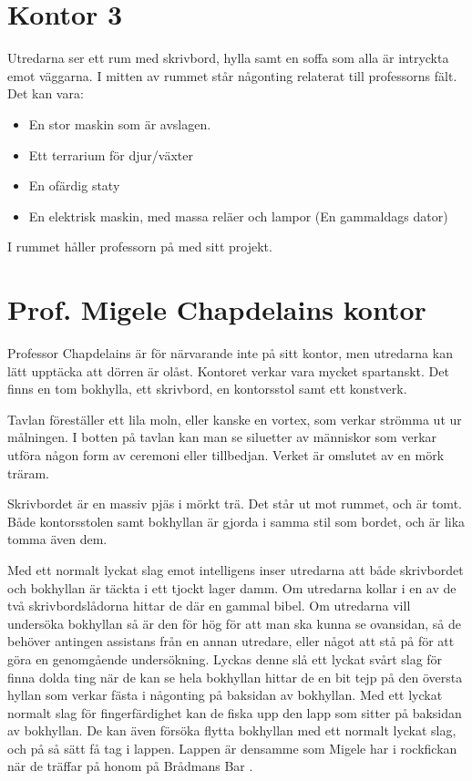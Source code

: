 \section*{Kontor 3}
Utredarna ser ett rum med skrivbord, hylla samt en soffa som alla är intryckta emot väggarna. I mitten av rummet står någonting relaterat till professorns fält. Det kan vara:
%
\begin{itemize}
	\item En stor maskin som är avslagen.
	\item Ett terrarium för djur/växter
	\item En ofärdig staty
	\item En elektrisk maskin, med massa reläer och lampor (En gammaldags dator)
\end{itemize}

I rummet håller professorn på med sitt projekt.


\section{Prof. Migele Chapdelains kontor}
\label{loc:ChapdelainsKontor}
%
Professor Chapdelains är för närvarande inte på sitt kontor, men utredarna kan lätt upptäcka att dörren är olåst. Kontoret verkar vara mycket spartanskt. Det finns en tom bokhylla, ett skrivbord, en kontorsstol samt ett konstverk.

\begin{displayquote}
	Tavlan föreställer ett lila moln, eller kanske en vortex, som verkar strömma ut ur målningen. I botten på tavlan kan man se siluetter av människor som verkar utföra någon form av ceremoni eller tillbedjan. Verket är omslutet av en mörk träram.
\end{displayquote}

\begin{displayquote}
	Skrivbordet är en massiv pjäs i mörkt trä. Det står ut mot rummet, och är tomt. Både kontorsstolen samt bokhyllan är gjorda i samma stil som bordet, och är lika tomma även dem.
\end{displayquote}
%
Med ett normalt lyckat slag emot intelligens inser utredarna att både skrivbordet och bokhyllan är täckta i ett tjockt lager damm. Om utredarna kollar i en av de två skrivbordslådorna hittar de där en gammal bibel. Om utredarna vill undersöka bokhyllan så är den för hög för att man ska kunna se ovansidan, så de behöver antingen assistans från en annan utredare, eller något att stå på för att göra en genomgående undersökning. Lyckas denne slå ett lyckat svårt slag för finna dolda ting när de kan se hela bokhyllan hittar de en bit tejp på den översta hyllan som verkar fästa i någonting på baksidan av bokhyllan. Med ett lyckat normalt slag för fingerfärdighet kan de fiska upp den lapp som sitter på baksidan av bokhyllan. De kan även försöka flytta bokhyllan med ett normalt lyckat slag, och på så sätt få tag i lappen. Lappen är densamme som Migele har i rockfickan när de träffar på honom på Brådmans Bar \sectiondescribe{\ref{loc:BradmansBar}}.
